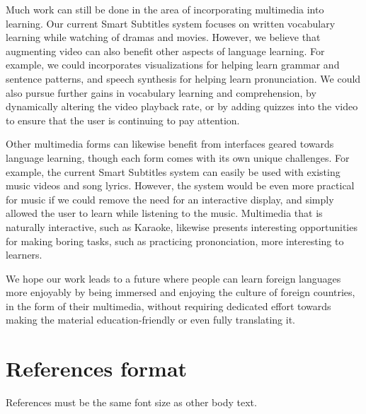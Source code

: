 \documentclass{sigchi}
\begin{document}
Much work can still be done in the area of incorporating multimedia into learning. Our current Smart Subtitles system focuses on written vocabulary learning while watching of dramas and movies.
However, we believe that augmenting video can also benefit other aspects of language learning. For example, we could
incorporates visualizations for helping learn grammar and sentence patterns,
and speech synthesis for helping learn pronunciation. We could also 
pursue further gains in vocabulary learning and comprehension,
by dynamically altering the video playback rate, or by adding
quizzes into the video to ensure that the user is continuing to pay attention.

Other multimedia forms can likewise benefit from interfaces geared
towards language learning, though each form comes with its own
unique challenges. For example, the current Smart Subtitles system can
easily be used with existing music videos and song lyrics.
However, the system would be even more practical for music if
we could remove the need for an interactive display, and simply
allowed the user to learn while listening to the music.
Multimedia that is naturally interactive, such as Karaoke,
likewise presents interesting opportunities for
making boring tasks, such as practicing prononciation, more interesting
to learners.

We hope our work leads to a future where people can learn foreign languages more enjoyably by being immersed and enjoying the culture of foreign countries, in the form of their multimedia, without requiring dedicated effort towards making the material education-friendly or even fully translating it.

\balance

\section{References format}
References must be the same font size as other body text.




\end{document}
